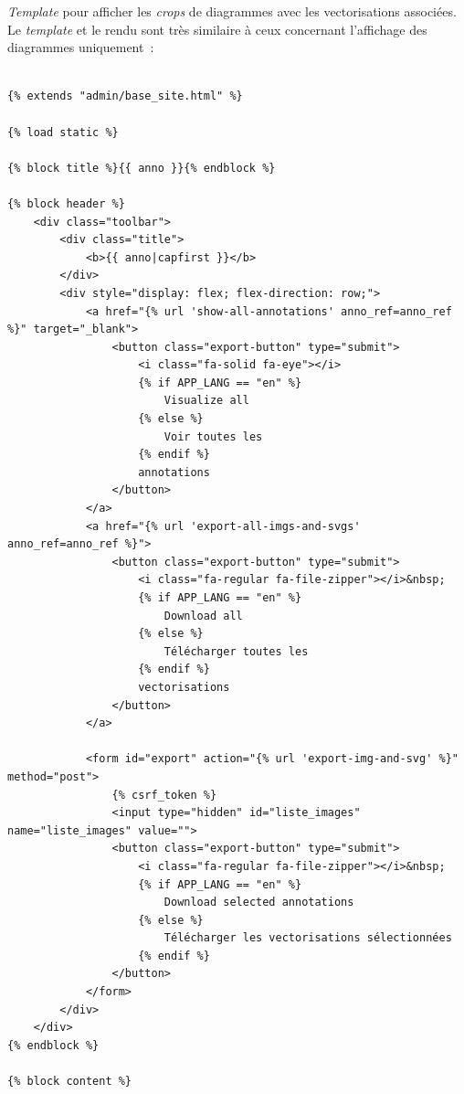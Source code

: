 \textit{Template} pour afficher les \textit{crops} de diagrammes avec les vectorisations associées. Le \textit{template} et le rendu sont très similaire à ceux concernant l'affichage des diagrammes uniquement~: 

\begin{lstlisting}[language=HTML5, frame=single, breaklines=true, caption={Template \html pour afficher les extractions et leurs vectorisations.}]

{% extends "admin/base_site.html" %}

{% load static %}

{% block title %}{{ anno }}{% endblock %}

{% block header %}
    <div class="toolbar">
        <div class="title">
            <b>{{ anno|capfirst }}</b>
        </div>
        <div style="display: flex; flex-direction: row;">
            <a href="{% url 'show-all-annotations' anno_ref=anno_ref %}" target="_blank">
                <button class="export-button" type="submit">
                    <i class="fa-solid fa-eye"></i>
                    {% if APP_LANG == "en" %}
                        Visualize all
                    {% else %}
                        Voir toutes les
                    {% endif %}
                    annotations
                </button>
            </a>
            <a href="{% url 'export-all-imgs-and-svgs' anno_ref=anno_ref %}">
                <button class="export-button" type="submit">
                    <i class="fa-regular fa-file-zipper"></i>&nbsp;
                    {% if APP_LANG == "en" %}
                        Download all
                    {% else %}
                        Télécharger toutes les
                    {% endif %}
                    vectorisations
                </button>
            </a>

            <form id="export" action="{% url 'export-img-and-svg' %}" method="post">
                {% csrf_token %}
                <input type="hidden" id="liste_images" name="liste_images" value="">
                <button class="export-button" type="submit">
                    <i class="fa-regular fa-file-zipper"></i>&nbsp;
                    {% if APP_LANG == "en" %}
                        Download selected annotations
                    {% else %}
                        Télécharger les vectorisations sélectionnées
                    {% endif %}
                </button>
            </form>
        </div>
    </div>
{% endblock %}

{% block content %}


\end{lstlisting}
